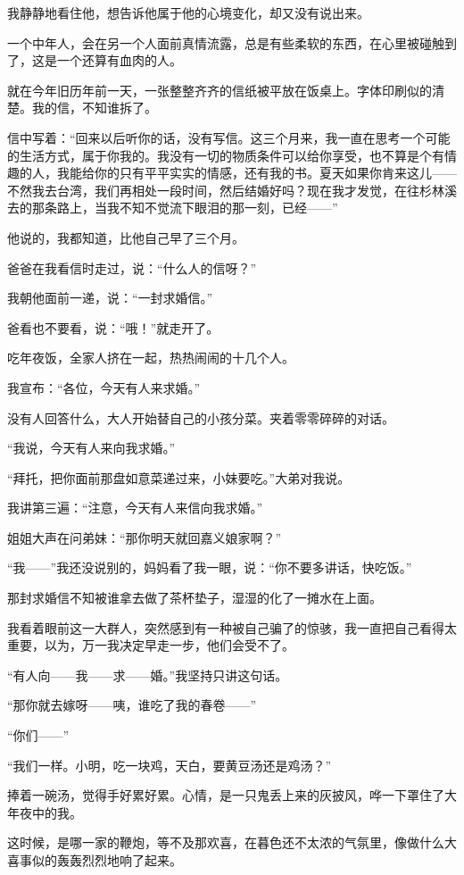 \par 我静静地看住他，想告诉他属于他的心境变化，却又没有说出来。
\par 一个中年人，会在另一个人面前真情流露，总是有些柔软的东西，在心里被碰触到了，这是一个还算有血肉的人。
\par 就在今年旧历年前一天，一张整整齐齐的信纸被平放在饭桌上。字体印刷似的清楚。我的信，不知谁拆了。
\par 信中写着：“回来以后听你的话，没有写信。这三个月来，我一直在思考一个可能的生活方式，属于你我的。我没有一切的物质条件可以给你享受，也不算是个有情趣的人，我能给你的只有平平实实的情感，还有我的书。夏天如果你肯来这儿——不然我去台湾，我们再相处一段时间，然后结婚好吗？现在我才发觉，在往杉林溪去的那条路上，当我不知不觉流下眼泪的那一刻，已经——”
\par 他说的，我都知道，比他自己早了三个月。
\par 爸爸在我看信时走过，说：“什么人的信呀？”
\par 我朝他面前一递，说：“一封求婚信。”
\par 爸看也不要看，说：“哦！”就走开了。
\par 吃年夜饭，全家人挤在一起，热热闹闹的十几个人。
\par 我宣布：“各位，今天有人来求婚。”
\par 没有人回答什么，大人开始替自己的小孩分菜。夹着零零碎碎的对话。
\par “我说，今天有人来向我求婚。”
\par “拜托，把你面前那盘如意菜递过来，小妹要吃。”大弟对我说。
\par 我讲第三遍：“注意，今天有人来信向我求婚。”
\par 姐姐大声在问弟妹：“那你明天就回嘉义娘家啊？”
\par “我——”我还没说别的，妈妈看了我一眼，说：“你不要多讲话，快吃饭。”
\par 那封求婚信不知被谁拿去做了茶杯垫子，湿湿的化了一摊水在上面。
\par 我看着眼前这一大群人，突然感到有一种被自己骗了的惊骇，我一直把自己看得太重要，以为，万一我决定早走一步，他们会受不了。
\par “有人向——我——求——婚。”我坚持只讲这句话。
\par “那你就去嫁呀——咦，谁吃了我的春卷——”
\par “你们——”
\par “我们一样。小明，吃一块鸡，天白，要黄豆汤还是鸡汤？”
\par 捧着一碗汤，觉得手好累好累。心情，是一只鬼丢上来的灰披风，哗一下罩住了大年夜中的我。
\par 这时候，是哪一家的鞭炮，等不及那欢喜，在暮色还不太浓的气氛里，像做什么大喜事似的轰轰烈烈地响了起来。


